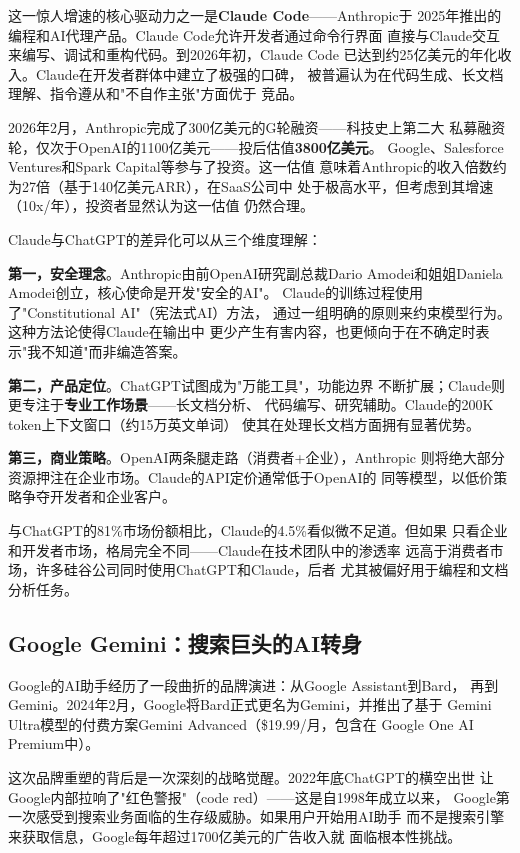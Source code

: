 这一惊人增速的核心驱动力之一是\textbf{Claude Code}——Anthropic于
2025年推出的编程和AI代理产品。Claude Code允许开发者通过命令行界面
直接与Claude交互来编写、调试和重构代码。到2026年初，Claude Code
已达到约25亿美元的年化收入。Claude在开发者群体中建立了极强的口碑，
被普遍认为在代码生成、长文档理解、指令遵从和"不自作主张"方面优于
竞品。

2026年2月，Anthropic完成了300亿美元的G轮融资——科技史上第二大
私募融资轮，仅次于OpenAI的1100亿美元——投后估值\textbf{3800亿美元}。
Google、Salesforce Ventures和Spark Capital等参与了投资。这一估值
意味着Anthropic的收入倍数约为27倍（基于140亿美元ARR），在SaaS公司中
处于极高水平，但考虑到其增速（10x/年），投资者显然认为这一估值
仍然合理。

Claude与ChatGPT的差异化可以从三个维度理解：

\textbf{第一，安全理念}。Anthropic由前OpenAI研究副总裁Dario
Amodei和姐姐Daniela Amodei创立，核心使命是开发"安全的AI"。
Claude的训练过程使用了"Constitutional AI"（宪法式AI）方法，
通过一组明确的原则来约束模型行为。这种方法论使得Claude在输出中
更少产生有害内容，也更倾向于在不确定时表示"我不知道"而非编造答案。

\textbf{第二，产品定位}。ChatGPT试图成为"万能工具"，功能边界
不断扩展；Claude则更专注于\textbf{专业工作场景}——长文档分析、
代码编写、研究辅助。Claude的200K token上下文窗口（约15万英文单词）
使其在处理长文档方面拥有显著优势。

\textbf{第三，商业策略}。OpenAI两条腿走路（消费者+企业），Anthropic
则将绝大部分资源押注在企业市场。Claude的API定价通常低于OpenAI的
同等模型，以低价策略争夺开发者和企业客户。

与ChatGPT的81\%市场份额相比，Claude的4.5\%看似微不足道。但如果
只看企业和开发者市场，格局完全不同——Claude在技术团队中的渗透率
远高于消费者市场，许多硅谷公司同时使用ChatGPT和Claude，后者
尤其被偏好用于编程和文档分析任务。

\subsection{Google Gemini：搜索巨头的AI转身}
\label{subsec:gemini-assistant}

Google的AI助手经历了一段曲折的品牌演进：从Google Assistant到Bard，
再到Gemini。2024年2月，Google将Bard正式更名为Gemini，并推出了基于
Gemini Ultra模型的付费方案Gemini Advanced（\$19.99/月，包含在
Google One AI Premium中）。

这次品牌重塑的背后是一次深刻的战略觉醒。2022年底ChatGPT的横空出世
让Google内部拉响了"红色警报"（code red）——这是自1998年成立以来，
Google第一次感受到搜索业务面临的生存级威胁。如果用户开始用AI助手
而不是搜索引擎来获取信息，Google每年超过1700亿美元的广告收入就
面临根本性挑战。

